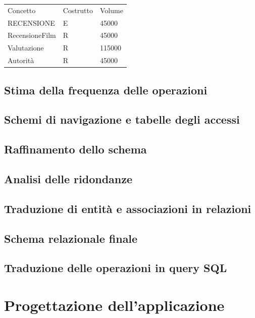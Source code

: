 \documentclass[a4paper,12pt]{report}
\begin{document}
	\begin{table}[H]
		\centering
		\begin{tabular}{|lll|}
			\hline
			\rowcolor[HTML]{FFCE93} 
			\multicolumn{3}{|l|}{\cellcolor[HTML]{FFCE93}Recensioni} \\ \hline
			\rowcolor[HTML]{CBCEFB} 
			Concetto              & Costrutto        & Volume        \\ \hline
			RECENSIONE            & E                & 45000         \\ \hline
			RecensioneFilm        & R                & 45000         \\ \hline
			Valutazione           & R                & 115000        \\ \hline
			Autorità              & R                & 45000         \\ \hline
		\end{tabular}
	\end{table}
	\section{Stima della frequenza delle operazioni}
	\section{Schemi di navigazione e tabelle degli accessi}
	\section{Raffinamento dello schema}
	\section{Analisi delle ridondanze}
	\section{Traduzione di entità e associazioni in relazioni}
	\section{Schema relazionale finale}
	\section{Traduzione delle operazioni in query SQL}
	\chapter{Progettazione dell'applicazione}
\end{document}
